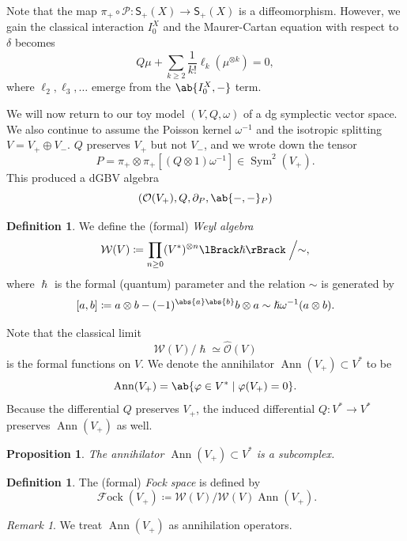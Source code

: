 \documentclass[article,10pt,oneside,oldfontcommands]{memoir}
\newtheorem{prop}[thm]{Proposition}
\theoremstyle{definition}
\newtheorem{defn}[thm]{Definition}
\theoremstyle{remark}
\newtheorem{rmk}[thm]{Remark}
\theoremstyle{plain}
\theoremstyle{definition}
\theoremstyle{remark}
\newcommand{\mc}[1]{\mathcal{#1}}
\newcommand{\on}[1]{\operatorname{#1}}
\newcommand{\ms}[1]{\mathsf{#1}}
\newcommand{\1}{\mathbf{1}}
\newcommand{\2}{\mathbf{2}}
\newcommand{\3}{\mathbf{3}}
\newcommand{\ps}[1]{\lBrack #1 \rBrack}
\DeclareMathOperator{\Sym}{Sym}
\DeclareMathOperator{\Fock}{\mc{F}ock}
\begin{document}
Note that the map \(\pi_+ \circ \mc{P} \colon \ms{S}_+(X) \to \ms{S}_+(X)\) is a diffeomorphism. However, we gain the classical interaction \(I_0^X\) and the Maurer-Cartan equation with respect to \(\delta\) becomes
\[ Q \mu + \sum_{k \geq 2} \frac{1}{k!} \ell_k (\mu^{\otimes k}) = 0, \]
where \(\ell_2, \ell_3, \ldots\) emerge from the \(\ab\{ I_0^X, -\}\) term.

We will now return to our toy model \((V, Q, \omega)\) of a dg symplectic vector space. We also continue to assume the Poisson kernel \(\omega^{-1}\) and the isotropic splitting \(V = V_+ \oplus V_-\). \(Q\) preserves \(V_+\) but not \(V_-\), and we wrote down the tensor
\[ P = \pi_+ \otimes \pi_+ [(Q \otimes 1)\omega^{-1}] \in \Sym^2(V_+). \]
This produced a dGBV algebra
\[ (\mc{O}(V_+), Q, \partial_P, \ab\{-,-\}_P) \]

\begin{defn}
    We define the (formal) \textit{Weyl algebra} 
    \[ \mc{W}(V) \coloneqq \prod_{n \geq 0} (V^*)^{\otimes n} \ps{\hslash} \Bigm/ \sim, \]
    where \(\hslash\) is the formal (quantum) parameter and the relation \(\sim\) is generated by
    \[ [a,b] \coloneqq a \otimes b - (-1)^{\abs{a}\abs{b}} b \otimes a \sim \hslash \omega^{-1}(a \otimes b). \]
\end{defn}

Note that the classical limit
\[ \mc{W}(V) / \hslash \simeq \hat{\mc{O}}(V) \]
is the formal functions on \(V\). We denote the annihilator \(\on{Ann}(V_+) \subset V^*\) to be 
\[ \on{Ann}(V_+) = \ab\{ \varphi \in V^* \mid \varphi(V_+) = 0 \}. \]
Because the differential \(Q\) preserves \(V_+\), the induced differential \(Q \colon V^* \to V^*\) preserves \(\on{Ann}(V_+)\) as well.

\begin{prop}
    The annihilator \(\on{Ann}(V_+) \subset V^*\) is a subcomplex.
\end{prop}

\begin{defn}
    The (formal) \textit{Fock space} is defined by
    \[ \Fock(V_+) \coloneqq \mc{W}(V) / \mc{W}(V) \on{Ann}(V_+). \]
\end{defn}

\begin{rmk}
    We treat \(\on{Ann}(V_+)\) as annihilation operators.
\end{rmk}
\end{document}
